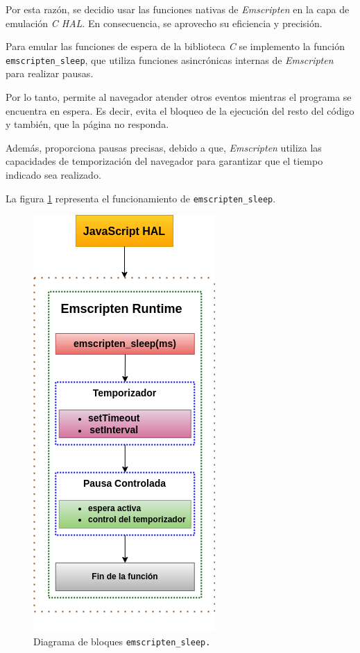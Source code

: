 Por esta razón, se decidio usar las funciones nativas de \textit{Emscripten} en la capa de emulación \textit{C HAL}. En consecuencia, se aprovecho su eficiencia y precisión.

Para emular las funciones de espera de la biblioteca \textit{C} se implemento la función \texttt{emscripten\_sleep}, que utiliza funciones asincrónicas internas de \textit{Emscripten} para realizar pausas. 

Por lo tanto, permite al navegador atender otros eventos mientras el programa se encuentra en espera. Es decir, evita el bloqueo de la ejecución del resto del código y también, que la página no responda.

Además, proporciona pausas precisas, debido a que, \textit{Emscripten}  utiliza las capacidades de temporización del navegador para garantizar que el tiempo indicado sea realizado.

La figura \ref{fig:emscriptenDelay} representa el funcionamiento de  \texttt{emscripten\_sleep}. 


\begin{figure}[ht]
	\centering
	\includegraphics[scale=.50]{./Figures/emscriptenDelay.png}
	\caption{Diagrama de bloques \texttt{emscripten\_sleep.}}
	\label{fig:emscriptenDelay}
\end{figure}




